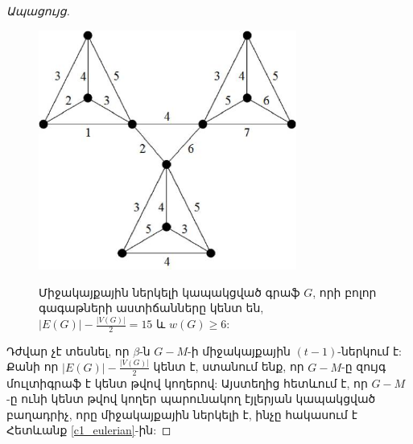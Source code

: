 \begin{hide}
\begin{proof}[Ապացույց]
\begin{figure}[h]
\begin{center}
\includegraphics[width=20pc]{figures/W-bound-fig2.eps}\\
\caption{Միջակայքային ներկելի կապակցված գրաֆ $G$, որի բոլոր գագաթների աստիճանները կենտ են, $|E(G)|-\frac{|V(G)|}{2}=15$ և $w(G) \geq 6$:}
\label{f1_odd}
\end{center}
\end{figure}

Դժվար չէ տեսնել, որ $\beta$-ն $G-M$-ի միջակայքային $(t-1)$-ներկում է: Քանի որ $\vert E(G)\vert-\frac{\vert V(G)\vert}{2}$ կենտ է, ստանում ենք, որ $G-M$-ը զույգ մուլտիգրաֆ է կենտ թվով կողերով: Այստեղից հետևում է, որ $G-M$-ը ունի կենտ թվով կողեր պարունակող էյլերյան կապակցված բաղադրիչ, որը միջակայքային ներկելի է, ինչը հակասում է Հետևանք \ref{c1_eulerian}-ին:
\end{proof}
\end{hide}